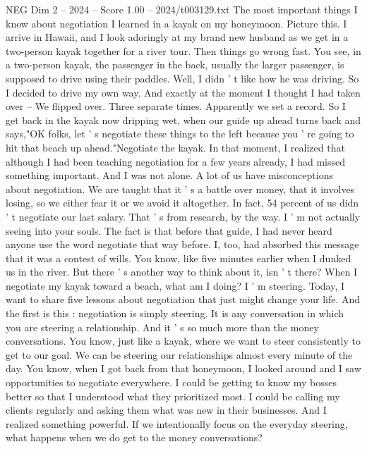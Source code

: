 \begin{textsample}{NEG Dim 2 – 2024 – Score 1.00 – 2024/t003129.txt}  \label{ex:f2_neg_062}
The most important things I know about negotiation I learned in a kayak on my honeymoon.
Picture this.
I arrive in Hawaii, and I look adoringly at my brand new husband as we get in a two-person kayak together for a river tour.
Then things go wrong fast.
You see, in a two-person kayak, the passenger in the back, usually the larger passenger, is supposed to drive using their paddles.
Well, I didn ' t like how he was driving.
So I decided to drive my own way.
And exactly at the moment I thought I had taken over -- We flipped over.
Three separate times.
Apparently we set a record.
So I get back in the kayak now dripping wet, when our guide up ahead turns back and says,"OK folks, let ' s negotiate these things to the left because you ' re going to hit that beach up ahead."Negotiate the kayak.
In that moment, I realized that although I had been teaching negotiation for a few years already, I had missed something important.
And I was not alone.
A lot of us have misconceptions about negotiation.
We are taught that it ' s a battle over money, that it involves losing, so we either fear it or we avoid it altogether.
In fact, 54 percent of us didn ' t negotiate our last salary.
That ' s from research, by the way.
I ' m not actually seeing into your souls.
The fact is that before that guide, I had never heard anyone use the word negotiate that way before.
I, too, had absorbed this message that it was a contest of wills.
You know, like five minutes earlier when I dunked us in the river.
But there ' s another way to think about it, isn ' t there?
When I negotiate my kayak toward a beach, what am I doing?
I ' m steering.
Today, I want to share five lessons about negotiation that just might change your life.
And the first is this : negotiation is simply steering.
It is any conversation in which you are steering a relationship.
And it ' s so much more than the money conversations.
You know, just like a kayak, where we want to steer consistently to get to our goal.
We can be steering our relationships almost every minute of the day.
You know, when I got back from that honeymoon, I looked around and I saw opportunities to negotiate everywhere.
I could be getting to know my bosses better so that I understood what they prioritized most.
I could be calling my clients regularly and asking them what was new in their businesses.
And I realized something powerful.
If we intentionally focus on the everyday steering, what happens when we do get to the money conversations?

\end{textsample}
